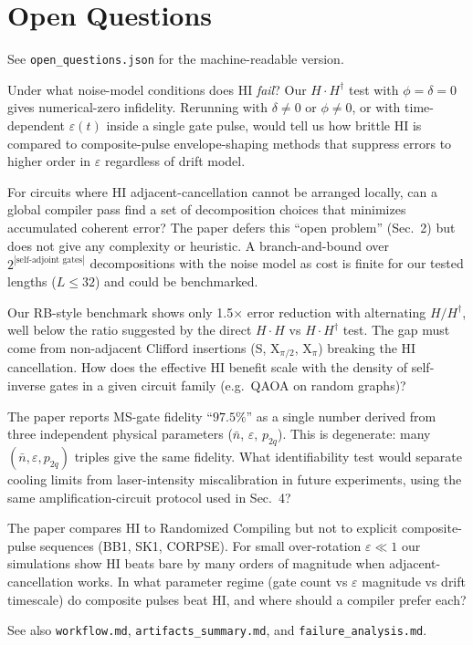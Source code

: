 \documentclass[11pt]{article}
\begin{document}
\section{Open Questions}
See \texttt{open\_questions.json} for the machine-readable version.
\begin{description}[leftmargin=1.4em]
\item[Q1] Under what noise-model conditions does HI \emph{fail}? Our $H\cdot H^{\dagger}$ test with $\phi=\delta=0$ gives numerical-zero infidelity. Rerunning with $\delta\ne 0$ or $\phi\ne 0$, or with time-dependent $\varepsilon(t)$ inside a single gate pulse, would tell us how brittle HI is compared to composite-pulse envelope-shaping methods that suppress errors to higher order in $\varepsilon$ regardless of drift model.
\item[Q2] For circuits where HI adjacent-cancellation cannot be arranged locally, can a global compiler pass find a set of decomposition choices that minimizes accumulated coherent error? The paper defers this ``open problem'' (Sec.~2) but does not give any complexity or heuristic. A branch-and-bound over $2^{|\text{self-adjoint gates}|}$ decompositions with the noise model as cost is finite for our tested lengths ($L\le 32$) and could be benchmarked.
\item[Q3] Our RB-style benchmark shows only 1.5$\times$ error reduction with alternating $H/H^{\dagger}$, well below the ratio suggested by the direct $H\cdot H$ vs $H\cdot H^{\dagger}$ test. The gap must come from non-adjacent Clifford insertions (S, X$_{\pi/2}$, X$_\pi$) breaking the HI cancellation. How does the effective HI benefit scale with the density of self-inverse gates in a given circuit family (e.g.\ QAOA on random graphs)?
\item[Q4] The paper reports MS-gate fidelity ``$97.5\%$'' as a single number derived from three independent physical parameters ($\bar n$, $\varepsilon$, $p_{2q}$). This is degenerate: many $(\bar n,\varepsilon,p_{2q})$ triples give the same fidelity. What identifiability test would separate cooling limits from laser-intensity miscalibration in future experiments, using the same amplification-circuit protocol used in Sec.~4?
\item[Q5] The paper compares HI to Randomized Compiling but not to explicit composite-pulse sequences (BB1, SK1, CORPSE). For small over-rotation $\varepsilon\ll 1$ our simulations show HI beats bare by many orders of magnitude when adjacent-cancellation works. In what parameter regime (gate count vs $\varepsilon$ magnitude vs drift timescale) do composite pulses beat HI, and where should a compiler prefer each?
\end{description}

\medskip
See also \texttt{workflow.md}, \texttt{artifacts\_summary.md}, and \texttt{failure\_analysis.md}.
\end{document}
